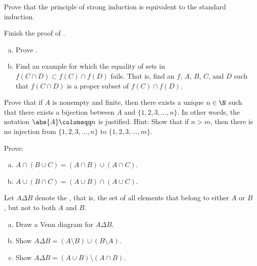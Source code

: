 \begin{exercise}
Prove that the principle of strong induction is equivalent to the standard
induction.
\end{exercise}

\begin{exercise}
Finish the proof of .
\end{exercise}

\begin{exercise}
\leavevmode
\begin{enumerate}[a)]
\item
Prove .
\item
Find an example for which the equality of sets
in 
$f( C \cap D) \subset f (C) \cap f (D)$
fails.  That is, find an $f$, $A$, $B$, $C$, and $D$ such that
$f( C \cap D)$ is a proper subset of $f(C) \cap f(D)$.
\end{enumerate}
\end{exercise}

\begin{exercise}[Tricky]
Prove that if $A$ is nonempty and finite, then there exists a unique
$n \in \N$ such
that there exists a bijection between $A$ and $\{ 1, 2, 3, \ldots, n \}$.
In other words, the notation $\abs{A} \coloneqq n$ is justified.
Hint: Show that if $n > m$, then there is no injection from
$\{ 1, 2, 3, \ldots, n \}$ to
$\{ 1, 2, 3, \ldots, m \}$.
\end{exercise}


\begin{exercise}
Prove:
\begin{enumerate}[a)]
\item $A \cap (B \cup C) = (A \cap B) \cup (A \cap C)$.
\item $A \cup (B \cap C) = (A \cup B) \cap (A \cup C)$.
\end{enumerate}
\end{exercise}

\begin{samepage}
\begin{exercise}
Let $A \Delta B$ denote the
\emph{}, that is, the set of all elements that
belong to either $A$ or $B$, but not to both $A$ and $B$.
\begin{enumerate}[a)]
\item
Draw a Venn diagram for
$A \Delta B$.
\item
Show $A \Delta B = (A \setminus B) \cup (B \setminus A)$.
\item
Show $A \Delta B = (A \cup B) \setminus ( A \cap B)$.
\end{enumerate}
\end{exercise}
\end{samepage}

